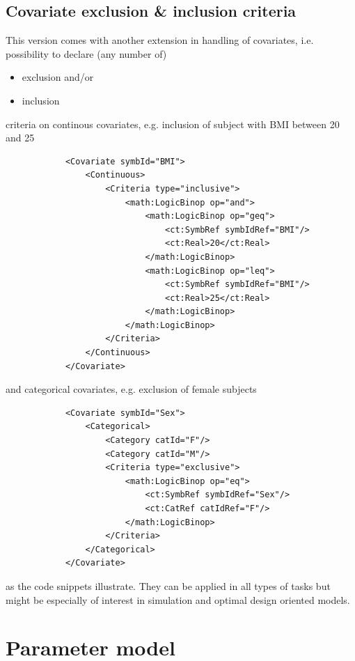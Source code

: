 \subsection{Covariate exclusion \& inclusion criteria}
\label{subsec:exclInclCriteria}
This version comes with another extension in handling of 
covariates, i.e. possibility to declare (any number of)
\begin{itemize}
\item 
exclusion and/or
\item
inclusion
\end{itemize}
criteria on continous covariates, e.g. inclusion of subject with BMI
between 20 and 25
\lstset{language=XML}
\begin{lstlisting}
            <Covariate symbId="BMI">
                <Continuous>
                    <Criteria type="inclusive">
                        <math:LogicBinop op="and">
                            <math:LogicBinop op="geq">
                                <ct:SymbRef symbIdRef="BMI"/>
                                <ct:Real>20</ct:Real>
                            </math:LogicBinop>
                            <math:LogicBinop op="leq">
                                <ct:SymbRef symbIdRef="BMI"/>
                                <ct:Real>25</ct:Real>
                            </math:LogicBinop>
                        </math:LogicBinop>
                    </Criteria>
                </Continuous>
            </Covariate>
\end{lstlisting}
and categorical covariates, e.g. exclusion of female subjects
\lstset{language=XML}
\begin{lstlisting}
            <Covariate symbId="Sex">
                <Categorical>
                    <Category catId="F"/>
                    <Category catId="M"/>
                    <Criteria type="exclusive">
                        <math:LogicBinop op="eq">
                            <ct:SymbRef symbIdRef="Sex"/>
                            <ct:CatRef catIdRef="F"/>
                        </math:LogicBinop>
                    </Criteria>
                </Categorical>
            </Covariate>
\end{lstlisting}
as the code snippets illustrate. They can be applied in all types of tasks 
but might be especially of interest in simulation and optimal design oriented models.


\section{Parameter model}
\label{sec:paramModel}

